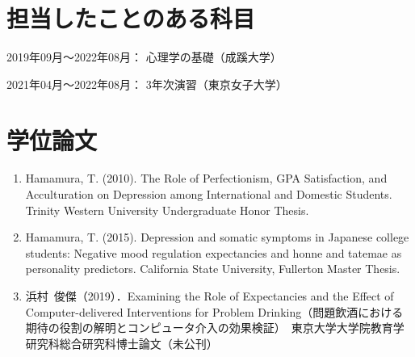 \documentclass[11pt,a4paper]{article}
\begin{document}
\section{担当したことのある科目}
\begin{description}
	\item 2019年09月～2022年08月： 心理学の基礎（成蹊大学）
	\item 2021年04月〜2022年08月： 3年次演習（東京女子大学）
\end{description}

\section{学位論文}
	\begin{enumerate}
		\item Hamamura, T.  (2010). The Role of Perfectionism, GPA Satisfaction, and Acculturation on Depression among International and Domestic Students. Trinity Western University Undergraduate Honor Thesis.
		\item Hamamura, T. (2015). Depression and somatic symptoms in Japanese college students: Negative mood regulation expectancies and honne and tatemae as personality predictors. California State University, Fullerton Master Thesis.
		\item 浜村\ 俊傑（2019）．Examining the Role of Expectancies and the Effect of Computer-delivered Interventions for Problem Drinking（問題飲酒における期待の役割の解明とコンピュータ介入の効果検証）　東京大学大学院教育学研究科総合研究科博士論文（未公刊）
	\end{enumerate}
\end{document}
